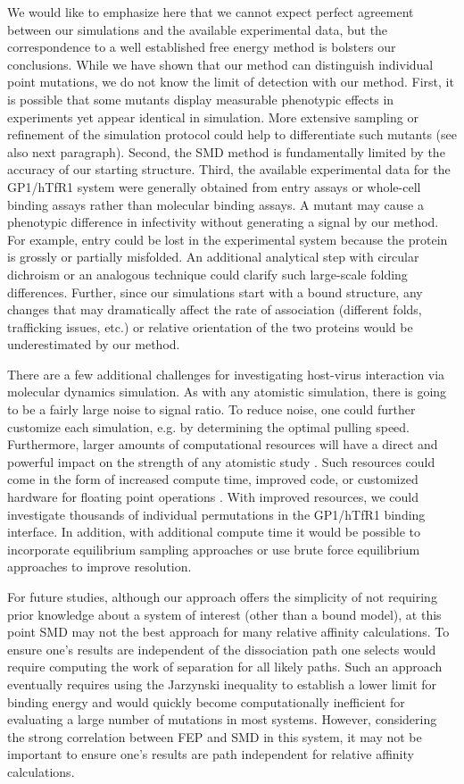 \documentclass[12pt]{article}
\begin{document}
We would like to emphasize here that we cannot expect perfect agreement between our simulations and the available experimental data, but the correspondence to a well established free energy method is bolsters our conclusions. While we have shown that our method can distinguish individual point mutations, we do not know the limit of detection with our method. First, it is possible that some mutants display measurable phenotypic effects in experiments yet appear identical in simulation. More extensive sampling or refinement of the simulation protocol could help to differentiate such mutants (see also next paragraph). Second, the SMD method is fundamentally limited by the accuracy of our starting structure. Third, the available experimental data for the GP1/hTfR1 system were generally obtained from entry assays or whole-cell binding assays rather than molecular binding assays. A mutant may cause a phenotypic difference in infectivity without generating a signal by our method. For example, entry could be lost in the experimental system because the protein is grossly or partially misfolded. An additional analytical step with circular dichroism or an analogous technique could clarify such large-scale folding differences. Further, since our simulations start with a bound structure, any changes that may dramatically affect the rate of association (different folds, trafficking issues, etc.) or relative orientation of the two proteins would be underestimated by our method. 

There are a few additional challenges for investigating host-virus interaction via molecular dynamics simulation. As with any atomistic simulation, there is going to be a fairly large noise to signal ratio. To reduce noise, one could further customize each simulation, e.g. by determining the optimal pulling speed. Furthermore, larger amounts of computational resources will have a direct and powerful impact on the strength of any atomistic study \citep{Shaw2012}. Such resources could come in the form of increased compute time, improved code, or customized hardware for floating point operations \citep{Shaw2011}. With improved resources, we could investigate thousands of individual permutations in the GP1/hTfR1 binding interface. In addition, with additional compute time it would be possible to incorporate equilibrium sampling approaches \citep{Buch2011} or use brute force equilibrium approaches \citep{Giorgino2012} to improve resolution. 

For future studies, although our approach offers the simplicity of not requiring prior knowledge about a system of interest (other than a bound model), at this point SMD may not the best approach for many relative affinity calculations. To ensure one's results are independent of the dissociation path one selects would require computing the work of separation for all likely paths. Such an approach eventually requires using the Jarzynski inequality \citep{Jar1997} to establish a lower limit for binding energy and would quickly become computationally inefficient for evaluating a large number of mutations in most systems. However, considering the strong correlation between FEP and SMD in this system, it may not be important to ensure one's results are path independent for relative affinity calculations. 
\end{document}
